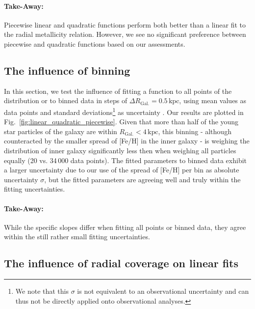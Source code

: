 \documentclass[fleqn,usenatbib]{mnras}
\begin{document}
\paragraph*{Take-Away:} Piecewise linear and quadratic functions perform both better than a linear fit to the radial metallicity relation. However, we see no significant preference between piecewise and quadratic functions based on our assessments.

\subsection{The influence of binning}
\label{sec:binning}

In this section, we test the influence of fitting a function to all points of the distribution or to binned data in steps of $\Delta R_\mathrm{Gal.} = 0.5\,\mathrm{kpc}$, using mean values as data points and standard deviations\footnote{We note that this $\sigma$ is not equivalent to an observational uncertainty and can thus not be directly applied onto observational analyses.} as uncertainty \citep[see also][who fitted functions to radially binned IllustrisTNG data]{Hemler2021}. Our results are plotted in Fig.~\ref{fig:linear_quadratic_piecewise}. Given that more than half of the young star particles of the galaxy are within $R_\mathrm{Gal.} < 4\,\mathrm{kpc}$, this binning - although counteracted by the smaller spread of [Fe/H] in the inner galaxy - is weighing the distribution of inner galaxy significantly less then when weighing all particles equally (20 vs. 34\,000 data points). The fitted parameters to binned data exhibit a larger uncertainty due to our use of the spread of [Fe/H] per bin as absolute uncertainty $\sigma$, but the fitted parameters are agreeing well and truly within the fitting uncertainties.

\paragraph*{Take-Away:} While the specific slopes differ when fitting all points or binned data, they agree within the still rather small fitting uncertainties.

\subsection{The influence of radial coverage on linear fits}
\label{sec:radial_coverage}
\end{document}
